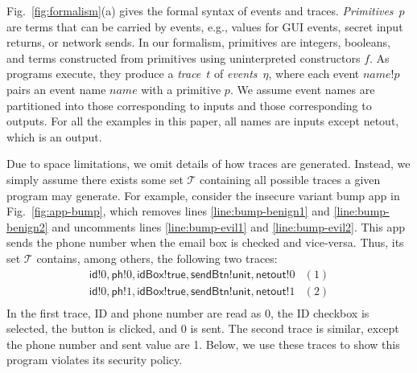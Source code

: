 \documentclass{llncs}
\newcommand{\code}[1]{\textsf{#1}} %
\newcommand{\sch}{\textit{name}}
\newcommand{\judge}{\vdash}
\newcommand{\toolname}{ClickRelease\xspace}
\newcommand{\tr}{t\xspace}
\newcommand{\tset}{\ensuremath{\mathcal{T}}\xspace}
\newcommand{\evt}{\eta}
\newcommand{\comment}[3][\color{red}]{{#1{[{#2}: {#3}]}}}
\newcommand{\kris}[1]{\comment[\color{orange}]{kris}{#1}}
\begin{document}
Fig.~\ref{fig:formalism}(a) gives the formal syntax of events and
traces.  \emph{Primitives}~$p$ are terms that can be carried by
events, e.g., values for GUI events, secret input returns, or network
sends.  In our formalism, primitives are integers, booleans, and terms
constructed from primitives using uninterpreted constructors $f$.  As
programs execute, they produce a \emph{trace}~$\tr$ of
\emph{events}~$\evt$, where each event $\sch!p$ pairs an event name
$\sch$ with a primitive $p$. We assume event names are partitioned
into those corresponding to inputs and those corresponding to
outputs. For all the examples in this paper, all names are inputs
except \code{netout}, which is an output.

Due to space limitations, we omit details of how traces are
generated. Instead, we simply assume there exists some set
$\tset$ containing all possible traces a given program may
generate.
%
%
For example, consider the insecure variant bump app in
Fig.~\ref{fig:app-bump}, which removes lines \ref{line:bump-benign1}
and \ref{line:bump-benign2} and uncomments lines \ref{line:bump-evil1}
and \ref{line:bump-evil2}.  This app sends the phone number when the
email box is checked and vice-versa. Thus, its set $\tset$
contains, among others, the following two traces:
\begin{displaymath}
  \begin{array}{cl}
    \code{id}!0, \code{ph}!0, \code{idBox}!\code{true},
    \code{sendBtn}!\code{unit}, \code{netout}!0 & (1) \\
    \code{id}!0, \code{ph}!1, \code{idBox}!\code{true},
    \code{sendBtn}!\code{unit}, \code{netout}!1 & (2) \\
  \end{array}
\end{displaymath}%
\lstset{language=Java}%
In the first trace, ID and phone number are read as 0, the
ID checkbox is selected, the button is clicked, and 0 is sent.
The second trace is similar, except the phone number and sent value
are 1. Below, we use these traces to show this program
violates its security policy.
\end{document}
